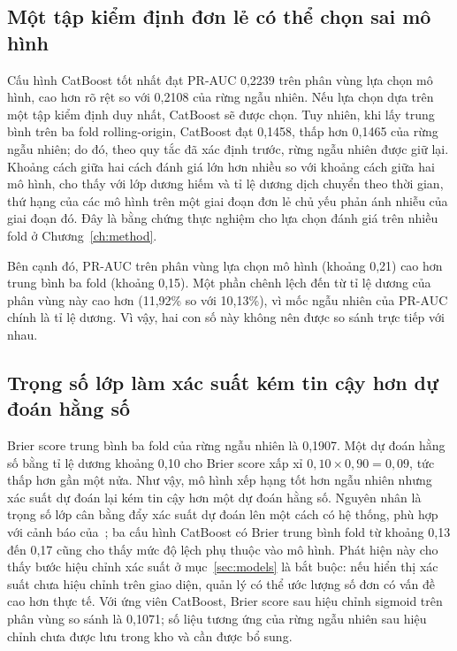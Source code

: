 \documentclass[12pt,a4paper]{report}
\begin{document}
\subsection{Một tập kiểm định đơn lẻ có thể chọn sai mô hình}

Cấu hình CatBoost tốt nhất đạt PR-AUC 0,2239 trên phân vùng lựa chọn mô hình, cao hơn rõ rệt so với 0,2108 của rừng ngẫu nhiên. Nếu lựa chọn dựa trên một tập kiểm định duy nhất, CatBoost sẽ được chọn. Tuy nhiên, khi lấy trung bình trên ba fold rolling-origin, CatBoost đạt 0,1458, thấp hơn 0,1465 của rừng ngẫu nhiên; do đó, theo quy tắc đã xác định trước, rừng ngẫu nhiên được giữ lại. Khoảng cách giữa hai cách đánh giá lớn hơn nhiều so với khoảng cách giữa hai mô hình, cho thấy với lớp dương hiếm và tỉ lệ dương dịch chuyển theo thời gian, thứ hạng của các mô hình trên một giai đoạn đơn lẻ chủ yếu phản ánh nhiễu của giai đoạn đó. Đây là bằng chứng thực nghiệm cho lựa chọn đánh giá trên nhiều fold ở Chương~\ref{ch:method}.

Bên cạnh đó, PR-AUC trên phân vùng lựa chọn mô hình (khoảng 0,21) cao hơn trung bình ba fold (khoảng 0,15). Một phần chênh lệch đến từ tỉ lệ dương của phân vùng này cao hơn (11,92\% so với 10,13\%), vì mốc ngẫu nhiên của PR-AUC chính là tỉ lệ dương. Vì vậy, hai con số này không nên được so sánh trực tiếp với nhau.

\subsection{Trọng số lớp làm xác suất kém tin cậy hơn dự đoán hằng số}

Brier score trung bình ba fold của rừng ngẫu nhiên là 0,1907. Một dự đoán hằng số bằng tỉ lệ dương khoảng 0,10 cho Brier score xấp xỉ $0{,}10 \times 0{,}90 = 0{,}09$, tức thấp hơn gần một nửa. Như vậy, mô hình xếp hạng tốt hơn ngẫu nhiên nhưng xác suất dự đoán lại kém tin cậy hơn một dự đoán hằng số. Nguyên nhân là trọng số lớp cân bằng đẩy xác suất dự đoán lên một cách có hệ thống, phù hợp với cảnh báo của~\textcite{vandengoorbergh2022}; ba cấu hình CatBoost có Brier trung bình fold từ khoảng 0,13 đến 0,17 cũng cho thấy mức độ lệch phụ thuộc vào mô hình. Phát hiện này cho thấy bước hiệu chỉnh xác suất ở mục~\ref{sec:models} là bắt buộc: nếu hiển thị xác suất chưa hiệu chỉnh trên giao diện, quản lý có thể ước lượng số đơn có vấn đề cao hơn thực tế. Với ứng viên CatBoost, Brier score sau hiệu chỉnh sigmoid trên phân vùng so sánh là 0,1071; số liệu tương ứng của rừng ngẫu nhiên sau hiệu chỉnh chưa được lưu trong kho và cần được bổ sung.
\end{document}
